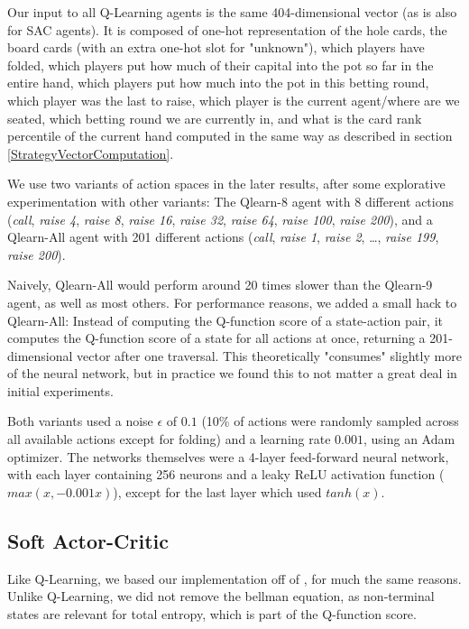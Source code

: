 Our input to all Q-Learning agents is the same 404-dimensional vector  (as is also for SAC agents). It is composed of one-hot representation of the hole cards, the board cards (with an extra one-hot slot for "unknown"), which players have folded, which players put how much of their capital into the pot so far in the entire hand, which players put how much into the pot in this betting round, which player was the last to raise, which player is the current agent/where are we seated, which betting round we are currently in, and what is the card rank percentile of the current hand computed in the same way as described in section \ref{StrategyVectorComputation}.

We use two variants of action spaces in the later results, after some explorative experimentation with other variants: The Qlearn-8 agent with 8 different actions (\textit{call}, \textit{raise 4}, \textit{raise 8}, \textit{raise 16}, \textit{raise 32}, \textit{raise 64}, \textit{raise 100}, \textit{raise 200}), and a Qlearn-All agent with 201 different actions (\textit{call}, \textit{raise 1}, \textit{raise 2}, \dots, \textit{raise 199}, \textit{raise 200}).

Naively, Qlearn-All would perform around 20 times slower than the Qlearn-9 agent, as well as most others. For performance reasons, we added a small hack to Qlearn-All: Instead of computing the Q-function score of a state-action pair, it computes the Q-function score of a state for all actions at once, returning a 201-dimensional vector after one traversal. This theoretically "consumes" slightly more of the neural network, but in practice we found this to not matter a great deal in initial experiments.

Both variants used a noise $\epsilon$ of $0.1$ (10\% of actions were randomly sampled across all available actions except for folding) and a learning rate $0.001$, using an Adam optimizer. The networks themselves were a 4-layer feed-forward neural network, with each layer containing 256 neurons and a leaky ReLU activation function ($max(x, -0.001x)$), except for the last layer which used $tanh(x)$.

\subsection{Soft Actor-Critic}
Like Q-Learning, we based our implementation off of \cite{SpinningUp2018}, for much the same reasons. Unlike Q-Learning, we did not remove the bellman equation, as non-terminal states are relevant for total entropy, which is part of the Q-function score.

